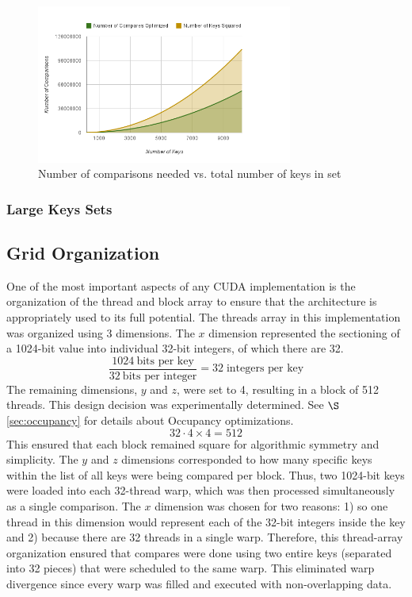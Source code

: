 \documentclass[smallextended]{svjour3}       %
\begin{document}
\begin{figure}
   \centering
   \includegraphics[width=0.75\textwidth]{chart_6}
   \caption{Number of comparisons needed vs. total number of keys in set}
   \label{fig:compvkeys}
\end{figure}

\subsubsection{Large Keys Sets}
\label{subsubsec:largesets}

\subsection{Grid Organization}
\label{sec:gridorg}
One of the most important aspects of any CUDA implementation is the 
organization of the thread and block array to ensure that the architecture is 
appropriately used to its full potential. The threads array in this 
implementation was organized using 3 dimensions. The $x$ dimension represented 
the sectioning of a 1024-bit value into individual 32-bit integers, of which 
there are 32. 
\begin{displaymath}
   \frac{1024 \:\mbox{bits per key}}{32 \:\mbox{bits per integer}} = 
   32 \;\mbox{integers per key}
\end{displaymath}
The remaining dimensions, $y$ and $z$, were set to 4, resulting in a block of 
512 threads. This design decision was experimentally determined. See 
$\S$\ref{sec:occupancy} for details about Occupancy optimizations.
\begin{displaymath}
   32 \cdot 4 \times 4 = 512
\end{displaymath}
This ensured that each block remained square for algorithmic 
symmetry and simplicity. The $y$ and $z$ dimensions corresponded to how many 
specific keys within the list of all keys were being compared per block. 
Thus, two 1024-bit keys were loaded into each 32-thread warp, which was 
then processed simultaneously as a single comparison. The $x$ dimension was 
chosen for two reasons: 1) so one thread in this dimension would represent 
each of the 32-bit integers inside the key and 2) because there are 32 threads 
in a single warp. Therefore, this thread-array organization ensured that 
compares were done using two entire keys (separated into 32 pieces) that were 
scheduled to the same warp. This eliminated warp divergence since every warp 
was filled and executed with non-overlapping data.
\end{document}
